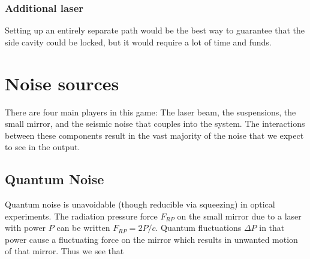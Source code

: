 \subsubsection{Additional laser}
Setting up an entirely separate path would be the best way to guarantee that the side cavity could be locked, but it would require a lot of time and funds.

%
%

\section{Noise sources}

There are four main players in this game:  The laser beam, the suspensions, the small mirror, and the seismic noise that couples into the system. 
The interactions between these components result in the vast majority of the noise that we expect to see in the output.

\subsection{Quantum Noise}

Quantum noise is unavoidable (though reducible via squeezing) in optical experiments.  The radiation pressure 
force $F_{RP}$ on the small mirror due to a laser with power $P$ can be written $F_{RP} = 2P/c$.  Quantum fluctuations $\Delta P$ in that power
cause a fluctuating force on the mirror which results in unwanted motion of that mirror. Thus we see that

